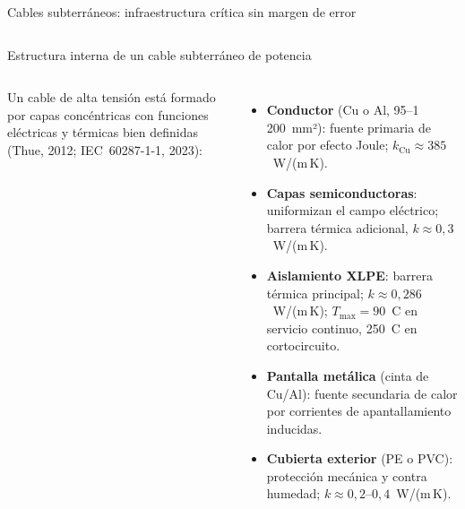 \documentclass[aspectratio=169]{beamer}
\newcommand{\refcite}[1]{{\footnotesize\color{gray!70!black} #1}}
\begin{document}
\begin{frame}{Cables subterráneos: infraestructura crítica sin margen de error}
\begin{columns}[T]
\end{columns}
\end{frame}

\begin{frame}{Estructura interna de un cable subterráneo de potencia}
\begin{columns}[T]
\justifying\small
Un cable de alta tensión está formado por capas concéntricas con
funciones eléctricas y térmicas bien definidas
\refcite{(Thue, 2012; IEC~60287-1-1, 2023)}:
\begin{itemize}[leftmargin=*]\scriptsize
    \item \textbf{Conductor} (Cu o Al, 95--1\,200~mm²): fuente primaria de
          calor por efecto Joule; $k_\text{Cu}\approx 385$~W/(m\,K).
    \item \textbf{Capas semiconductoras}: uniformizan el campo eléctrico;
          barrera térmica adicional, $k\approx 0{,}3$~W/(m\,K).
    \item \textbf{Aislamiento XLPE}: barrera térmica principal;
          $k\approx 0{,}286$~W/(m\,K); $T_{\max}=90$~\textdegree{}C en
          servicio continuo, 250~\textdegree{}C en cortocircuito.
    \item \textbf{Pantalla metálica} (cinta de Cu/Al): fuente secundaria
          de calor por corrientes de apantallamiento inducidas.
    \item \textbf{Cubierta exterior} (PE o PVC): protección mecánica y
          contra humedad; $k\approx 0{,}2$--$0{,}4$~W/(m\,K).
\end{itemize}


\end{columns}
\end{frame}
\end{document}
